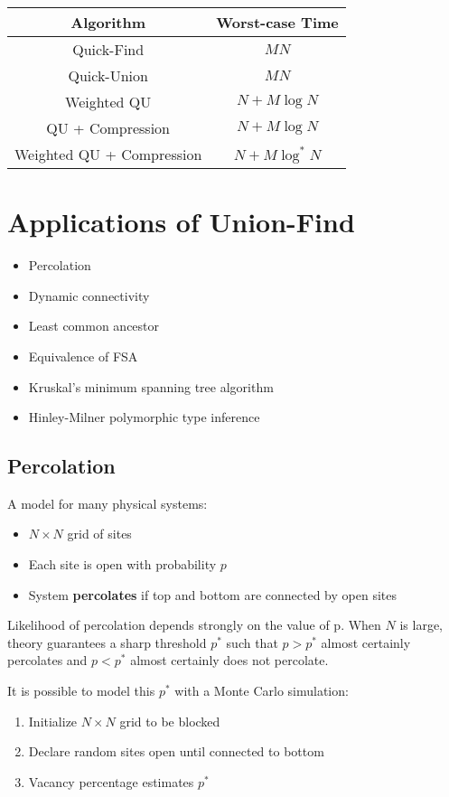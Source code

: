 \documentclass[11pt]{article}
\begin{document}
			\begin{center}\begin{tabular}[t]{c c}
			\hline
			\textbf{Algorithm}	&	\textbf{Worst-case Time}	\\\hline
			Quick-Find	&	$MN$	\\
			Quick-Union	&	$MN$	\\\hline
			Weighted QU	&	$N+M\log N$	\\
			QU + Compression	&	$N + M\log N$	\\
			Weighted QU + Compression	&	$N+M\log^* N$\\\hline
			\end{tabular}\end{center}
			
\section{Applications of Union-Find}
	\begin{itemize}
		\item Percolation
		\item Dynamic connectivity
		\item Least common ancestor
		\item Equivalence of FSA
		\item Kruskal's minimum spanning tree algorithm
		\item Hinley-Milner polymorphic type inference
	\end{itemize}
	
	\subsection{Percolation}
		A model for many physical systems:
		\begin{itemize}
			\item $N\times N$ grid of sites
			\item Each site is open with probability $p$
			\item System \textbf{percolates} if top and bottom are connected by open sites
		\end{itemize}
		
		Likelihood of percolation depends strongly on the value of p. When $N$ is large, theory guarantees a sharp threshold $p^*$ such that $p > p^*$ almost certainly percolates and $p < p^*$ almost certainly does not percolate.
		
		It is possible to model this $p^*$ with a Monte Carlo simulation:
		\begin{enumerate}
			\item Initialize $N\times N$ grid to be blocked
			\item Declare random sites open until connected to bottom
			\item Vacancy percentage estimates $p^*$
		\end{enumerate}
		
\end{document}
